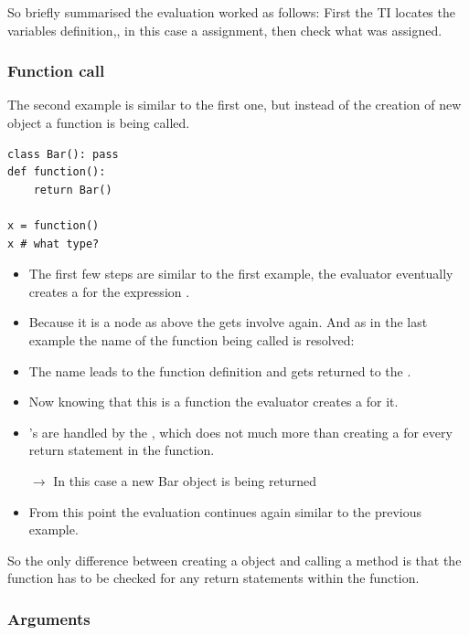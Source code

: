 \documentclass[12pt,halfparskip,DIV11,BCOR10mm]{scrreprt}
\begin{document}
So briefly summarised the evaluation worked as follows: First the TI locates the variables definition,, in this case a assignment, then check what was assigned. 

\subsubsection{Function call}

The second example is similar to the first one, but instead of the creation of new object a function is being called.

\begin{lstlisting}
class Bar(): pass
def function():
	return Bar()

x = function()
x # what type?
\end{lstlisting}

\begin{itemize}
	\item The first few steps are similar to the first example, the evaluator eventually creates a  for the expression .
	\item Because it is a  node as above the  gets involve again. And as in the last example the name of the function being called is resolved: 
	\item The name  leads to the function definition and gets returned to the .
	\item Now knowing that this is a function the evaluator creates a  for it.
	\item {}'s are handled by the , which does not much more than creating a  for every return statement in the function. 
	\item[$\rightarrow$] In this case a new Bar object is being returned
	\item From this point the evaluation continues again similar to the previous example. 
\end{itemize}

So the only difference between creating a object and calling a method is that the function has to be checked for any return statements within the function. 

\subsubsection{Arguments}
\end{document}
